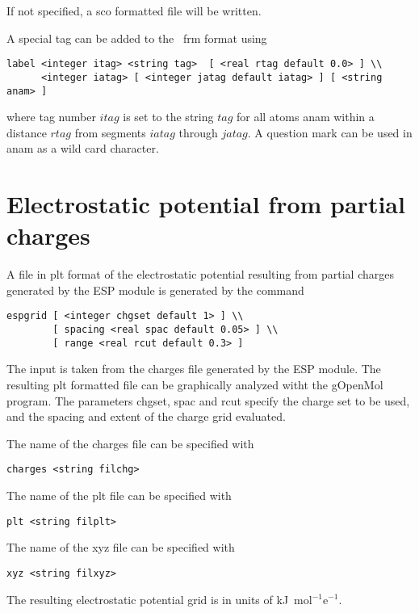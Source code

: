 If not specified, a {\rm sco} formatted file will be written.

A special tag can be added to the \ecce\ frm format using

\begin{verbatim}
label <integer itag> <string tag>  [ <real rtag default 0.0> ] \\
      <integer iatag> [ <integer jatag default iatag> ] [ <string anam> ]
\end{verbatim}

where tag number $itag$ is set to the string $tag$ for all atoms
anam within a distance $rtag$ from segments $iatag$ through $jatag$.
A question mark can be used in anam as a wild card character.

\section{Electrostatic potential from partial charges}

A file in plt format of the electrostatic potential resulting
from partial charges generated by the ESP module is generated
by the command

\begin{verbatim}
espgrid [ <integer chgset default 1> ] \\
        [ spacing <real spac default 0.05> ] \\
        [ range <real rcut default 0.3> ]
\end{verbatim}

The input is taken from the charges file generated by the ESP module. The
resulting plt formatted file can be graphically analyzed witht the
gOpenMol program. The parameters chgset, spac and rcut specify the
charge set to be used, and the spacing and extent of the charge grid
evaluated.

The name of the charges file can be specified with

\begin{verbatim}
charges <string filchg>
\end{verbatim}

The name of the plt file can be specified with

\begin{verbatim}
plt <string filplt>
\end{verbatim}

The name of the xyz file can be specified with

\begin{verbatim}
xyz <string filxyz>
\end{verbatim}

The resulting electrostatic potential grid is in units of
kJ\ mol$^{-1}$e$^{-1}$.